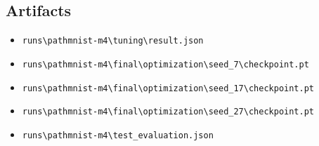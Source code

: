 \documentclass[10pt]{article}
\begin{document}
\subsection{Artifacts}
\begin{itemize}
\item \texttt{runs\textbackslash{}pathmnist-m4\textbackslash{}tuning\textbackslash{}result.json}
\item \texttt{runs\textbackslash{}pathmnist-m4\textbackslash{}final\textbackslash{}optimization\textbackslash{}seed\_7\textbackslash{}checkpoint.pt}
\item \texttt{runs\textbackslash{}pathmnist-m4\textbackslash{}final\textbackslash{}optimization\textbackslash{}seed\_17\textbackslash{}checkpoint.pt}
\item \texttt{runs\textbackslash{}pathmnist-m4\textbackslash{}final\textbackslash{}optimization\textbackslash{}seed\_27\textbackslash{}checkpoint.pt}
\item \texttt{runs\textbackslash{}pathmnist-m4\textbackslash{}test\_evaluation.json}
\end{itemize}
\end{document}
